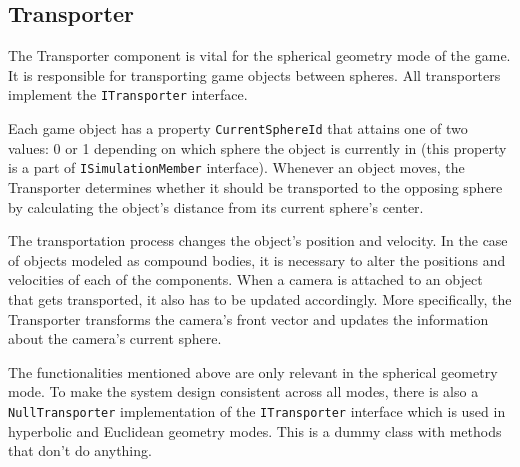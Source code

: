 \subsection{Transporter}
The Transporter component is vital for the spherical geometry mode of the game.
It is responsible for transporting game objects between spheres.
All transporters implement the \texttt{ITransporter} interface.

Each game object has a property \texttt{CurrentSphereId} that attains one of two values: 0 or 1 depending on which sphere the object is currently in (this property is a part of \texttt{ISimulationMember} interface).
Whenever an object moves, the Transporter determines whether it should be transported to the opposing sphere by calculating the object's distance from its current sphere's center.

The transportation process changes the object's position and velocity.
In the case of objects modeled as compound bodies, it is necessary to alter the positions and velocities of each of the components.
When a camera is attached to an object that gets transported, it also has to be updated accordingly.
More specifically, the Transporter transforms the camera's front vector and updates the information about the camera's current sphere.

The functionalities mentioned above are only relevant in the spherical geometry mode.
To make the system design consistent across all modes, there is also a \texttt{NullTransporter} implementation of the \texttt{ITransporter} interface which is used in hyperbolic and Euclidean geometry modes.
This is a dummy class with methods that don't do anything.